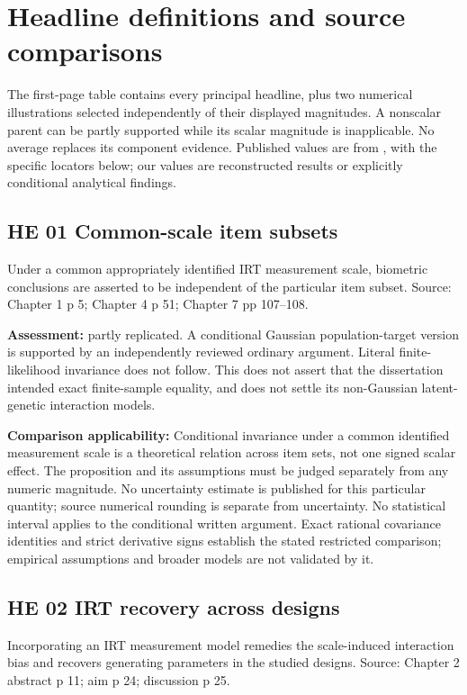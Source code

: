 \documentclass[11pt]{article}
\begin{document}
\appendix
\section{Headline definitions and source comparisons}\label{sec:definitions}
The first-page table contains every principal headline, plus two numerical illustrations selected independently of their displayed magnitudes. A nonscalar parent can be partly supported while its scalar magnitude is inapplicable. No average replaces its component evidence. Published values are from \citet{schwabe2016}, with the specific locators below; our values are reconstructed results or explicitly conditional analytical findings.
\subsection{HE 01 Common-scale item subsets}\label{head:HE01}
Under a common appropriately identified IRT measurement scale, biometric conclusions are asserted to be independent of the particular item subset. Source: Chapter 1 p 5; Chapter 4 p 51; Chapter 7 pp 107--108.

\textbf{Assessment:} partly replicated. A conditional Gaussian population-target version is supported by an independently reviewed ordinary argument. Literal finite-likelihood invariance does not follow. This does not assert that the dissertation intended exact finite-sample equality, and does not settle its non-Gaussian latent-genetic interaction models.

\textbf{Comparison applicability:} Conditional invariance under a common identified measurement scale is a theoretical relation across item sets, not one signed scalar effect. The proposition and its assumptions must be judged separately from any numeric magnitude. No uncertainty estimate is published for this particular quantity; source numerical rounding is separate from uncertainty. No statistical interval applies to the conditional written argument. Exact rational covariance identities and strict derivative signs establish the stated restricted comparison; empirical assumptions and broader models are not validated by it.
\subsection{HE 02 IRT recovery across designs}\label{head:HE02}
Incorporating an IRT measurement model remedies the scale-induced interaction bias and recovers generating parameters in the studied designs. Source: Chapter 2 abstract p 11; aim p 24; discussion p 25.
\end{document}
